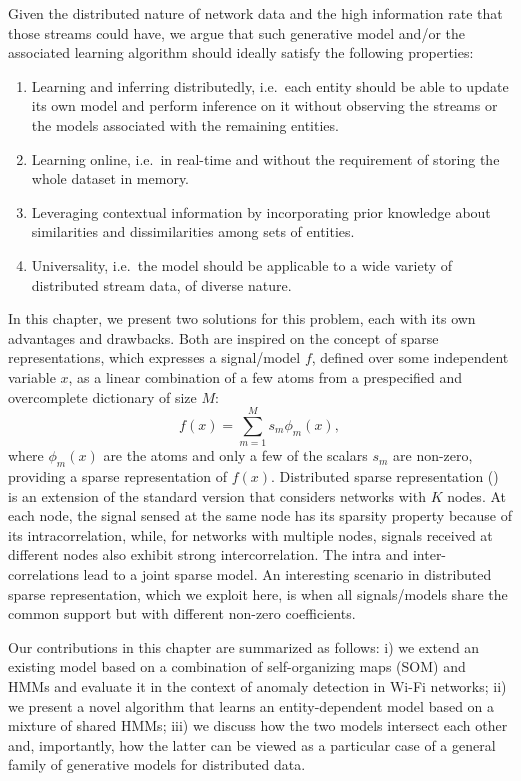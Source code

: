 Given the distributed nature of network data and the high information rate that those streams could have, we argue that such generative model and/or the associated learning algorithm should ideally satisfy the following properties:
\begin{enumerate}
	\item Learning and inferring distributedly, i.e.\ each entity should be able to update its own model and perform inference on it without observing the streams or the models associated with the remaining entities.
	\item Learning online, i.e.\ in real-time and without the requirement of storing the whole dataset in memory.
	\item Leveraging contextual information by incorporating prior knowledge about similarities and dissimilarities among sets of entities.
	\item Universality, i.e.\ the model should be applicable to a wide variety of distributed stream data, of diverse nature.
\end{enumerate}
In this chapter, we present two solutions for this problem, each with its own advantages and drawbacks. Both are inspired on the concept of sparse representations, which expresses a signal/model $f$, defined over some independent variable $x$, as a linear combination of a few atoms from a prespecified and overcomplete dictionary of size $M$:
\begin{equation}
\label{sparse_coding}
f(x)=\sum_{m=1}^M s_m \phi_m(x),
\end{equation}
where $\phi_m(x)$ are the atoms and only a few of the scalars $s_m$ are non-zero, providing a sparse representation of $f(x)$.  Distributed sparse representation (\citet{Baron}) is an extension of the standard version that considers networks with $K$ nodes. At each node, the signal sensed at the same node has its sparsity property because of its intracorrelation, while, for networks with multiple nodes, signals received at different nodes also exhibit strong intercorrelation.
The intra and inter-correlations lead to a joint sparse model. An interesting scenario in distributed sparse representation, which we exploit here, is when all signals/models share the common support but with different non-zero coefficients.

Our contributions in this chapter are summarized as follows: i) we extend an existing model based on a combination of self-organizing maps (SOM) and HMMs and evaluate it in the context of anomaly detection in Wi-Fi networks; ii) we present a novel algorithm that learns an entity-dependent model based on a mixture of shared HMMs; iii) we discuss how the two models intersect each other and, importantly, how the latter can be viewed as a particular case of a general family of generative models for distributed data.

